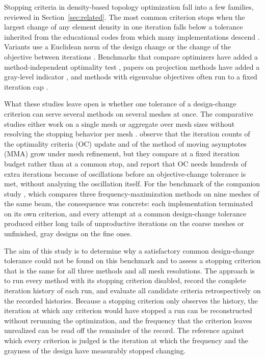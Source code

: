 \documentclass[11pt,a4paper]{article}
\begin{document}
Stopping criteria in density-based topology optimization fall into a few families, reviewed in Section~\ref{sec:related}. The most common criterion stops when the largest change of any element density in one iteration falls below a tolerance inherited from the educational codes from which many implementations descend \citep{Andreassen2011}. Variants use a Euclidean norm of the design change \citep{Yago2022} or the change of the objective between iterations \citep{Dunning2025}. Benchmarks that compare optimizers have added a method-independent optimality test \citep{RojasLabanda2015,Kim2025}, papers on projection methods have added a gray-level indicator \citep{Dunning2025}, and methods with eigenvalue objectives often run to a fixed iteration cap \citep{Zhang2023}.

What these studies leave open is whether one tolerance of a design-change criterion can serve several methods on several meshes at once. The comparative studies either work on a single mesh \citep{Yago2022} or aggregate over mesh sizes without resolving the stopping behavior per mesh \citep{RojasLabanda2015}. \citet{Kim2025} observe that the iteration counts of the optimality criteria (OC) update and of the method of moving asymptotes (MMA) grow under mesh refinement, but they compare at a fixed iteration budget rather than at a common stop, and \citet{Dunning2025} report that OC needs hundreds of extra iterations because of oscillations before an objective-change tolerance is met, without analyzing the oscillation itself. For the benchmark of the companion study \citep{Tauzowski2026}, which compares three frequency-maximization methods on nine meshes of the same beam, the consequence was concrete: each implementation terminated on its own criterion, and every attempt at a common design-change tolerance produced either long tails of unproductive iterations on the coarse meshes or unfinished, gray designs on the fine ones.

The aim of this study is to determine why a satisfactory common design-change tolerance could not be found on this benchmark and to assess a stopping criterion that is the same for all three methods and all mesh resolutions. The approach is to run every method with its stopping criterion disabled, record the complete iteration history of each run, and evaluate all candidate criteria retrospectively on the recorded histories. Because a stopping criterion only observes the history, the iteration at which any criterion would have stopped a run can be reconstructed without rerunning the optimization, and the frequency that the criterion leaves unrealized can be read off the remainder of the record. The reference against which every criterion is judged is the iteration at which the frequency and the grayness of the design have measurably stopped changing.
\end{document}
